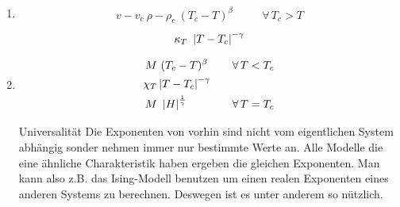 \begin{description}
    \begin{enumerate}[Beispiel I)]
      \item %
      \begin{align*}
        v - v_c ~ \rho- \rho_c ~ (T_c - T)^\beta && \quad\forall\, T_c > T
      \end{align*}
      \begin{align*}
        \kappa_T ~ \left| T - T_c \right|^{-\gamma}
      \end{align*}
    \item
      \begin{align*}
        M & ~ (T_c - T)^{\beta} && \quad\forall\, T < T_c \\
        \chi_T &  \left|  T - T_c \right|^{-\gamma} \\
        M & ~ \left| H \right|^{\frac{1}{\gamma}} && \quad\forall\, T = T_c
      \end{align*}
    \item[Universalität] Die Exponenten von vorhin sind nicht vom eigentlichen System
      abhängig sonder nehmen immer nur bestimmte Werte an. Alle Modelle
      die eine ähnliche Charakteristik haben ergeben die gleichen Exponenten.
      Man kann also z.B. das Ising-Modell benutzen um einen realen Exponenten eines
      anderen Systems zu berechnen. Deswegen ist es unter anderem so nützlich.


\end{enumerate}
\end{description}
